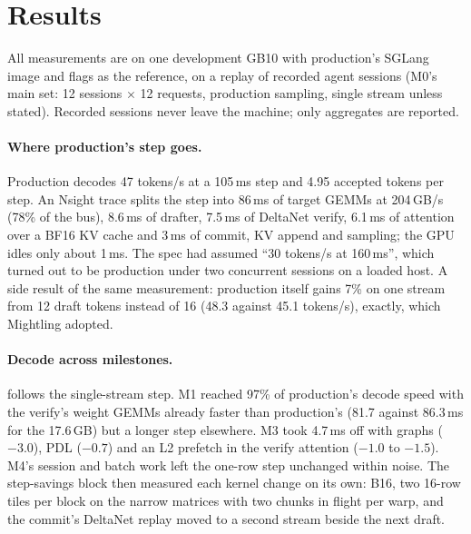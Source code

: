 \documentclass[11pt]{article}
\begin{document}
\section{Results}
\label{sec:results}

All measurements are on one development GB10 with production's SGLang image and flags as the reference, on a replay of
recorded agent sessions (M0's main set: 12 sessions $\times$ 12 requests, production sampling, single stream unless
stated). Recorded sessions never leave the machine; only aggregates are reported.

\paragraph{Where production's step goes.}
Production decodes 47 tokens/s at a 105\,ms step and 4.95 accepted tokens per step. An Nsight trace splits the step into
86\,ms of target GEMMs at 204\,GB/s (78\% of the bus), 8.6\,ms of drafter, 7.5\,ms of DeltaNet verify, 6.1\,ms of
attention over a BF16 KV cache and 3\,ms of commit, KV append and sampling; the GPU idles only about 1\,ms. The spec had
assumed ``30 tokens/s at 160\,ms'', which turned out to be production under two concurrent sessions on a loaded host. A
side result of the same measurement: production itself gains 7\% on one stream from 12 draft tokens instead of 16
(48.3 against 45.1 tokens/s), exactly, which Mightling adopted.

\paragraph{Decode across milestones.}
 follows the single-stream step. M1 reached 97\% of production's decode speed with the verify's weight
GEMMs already faster than production's (81.7 against 86.3\,ms for the 17.6\,GB) but a longer step elsewhere. M3 took
4.7\,ms off with graphs ($-3.0$), PDL ($-0.7$) and an L2 prefetch in the verify attention ($-1.0$ to $-1.5$). M4's
session and batch work left the one-row step unchanged within noise. The step-savings block then measured each kernel
change on its own: B16, two 16-row tiles per block on the narrow matrices with two chunks in flight per warp, and the
commit's DeltaNet replay moved to a second stream beside the next draft.
\end{document}
